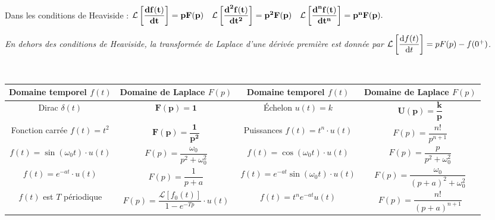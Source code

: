 \documentclass[10pt,fleqn]{article} %
\begin{document}
\begin{resultat}[Dérivation] ~\\


\noindent Dans les conditions de Heaviside :
$\mathbf{\mathcal{L}\left[ \dfrac{\text{\textbf{d}} f(t)}{\text{\textbf{d}} t}\right] =pF(p) 
 \quad
\mathcal{L}\left[ \dfrac{\text{\textbf{d}}^2f(t)}{\text{\textbf{d}} t^2}\right] =p^2F(p) 
 \quad
\mathcal{L}\left[ \dfrac{\text{\textbf{d}}^nf(t)}{\text{\textbf{d}} t^n}\right] =p^nF(p) }.$

\noindent\textit{\footnotesize{En dehors des conditions de Heaviside, la transformée de Laplace d'une dérivée première est donnée par $\mathcal{L}\left[ \dfrac{\mathrm{d} f(t)}{\mathrm{d} t}\right] =pF(p)-f(0^+)$.}}


\end{resultat}


\begin{defi} ~\\
\footnotesize{

\begin{center}
\begin{tabular}{|c|c||c|c|}
\hline
Domaine temporel $f(t)$ & Domaine de Laplace $F(p)$ & 
Domaine temporel $f(t)$ & Domaine de Laplace $F(p)$ \\
\hline
\hline
Dirac $\delta(t)$ &
$\mathbf{F(p)=1}$ &
Échelon $ u(t)=k $&
$ \mathbf{U(p) = \dfrac{k}{p}}$
\\
\hline
Fonction carrée $f(t)=t^2$& 
$\mathbf{F(p) =\dfrac{1}{p^2} }$ &
Puissances
$f(t) = t^n\cdot u(t)$ &
$F(p)=\dfrac{n!}{p^{n+1}} $
\\
\hline
$f(t) = \sin \left( \omega_0 t\right) \cdot u(t)$ &
$F(p) = \dfrac{\omega_0}{p^2+\omega_0^2} $ &
$f(t) = \cos \left( \omega_0 t\right) \cdot u(t)$ & 
$F(p) = \dfrac{p}{p^2+\omega_0^2} $ \\
\hline
$f(t)= e^{-at}\cdot u(t)$ & 
$F(p)= \dfrac{1}{p+a}$ &
$f(t) = e^{-at}\sin\left( \omega_0 t\right) \cdot u(t)$ &
$F(p)=\dfrac{\omega_0}{\left( p+a\right)^2 + \omega_0^2}$  \\
\hline
$f(t)$ est $T$ périodique &
$F(p)= \dfrac{\mathcal{L} \left[f_0 (t)\right]}{1-e^{-Tp}} \cdot u(t)$ &
$f(t)=t^ne^{-at}u(t)$ & $F(p)=\dfrac{n!}{\left( p+a\right)^{n+1}}$
\\
\hline
\end{tabular}
\end{center}}
\end{defi}
\end{document}
